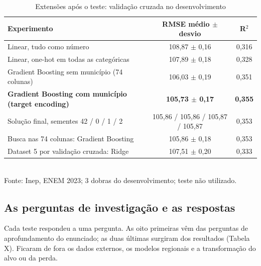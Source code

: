 \documentclass[conference,a4paper]{IEEEtran}
\begin{document}
\begin{table}[!t]
\caption{Extensões após o teste: validação cruzada no desenvolvimento}
\centering\footnotesize
\begin{tabularx}{\textwidth}{>{\raggedright\arraybackslash}Xcc}
\toprule
\textbf{Experimento} & \textbf{RMSE médio $\pm$ desvio} & \textbf{R$^2$} \\
\midrule
Linear, tudo como número & 108,87 $\pm$ 0,16 & 0,316 \\
Linear, one-hot em todas as categóricas & 107,89 $\pm$ 0,18 & 0,328 \\
Gradient Boosting sem município (74 colunas) & 106,03 $\pm$ 0,19 & 0,351 \\
\textbf{Gradient Boosting com município (target encoding)} & \textbf{105,73 $\pm$ 0,17} & \textbf{0,355} \\
Solução final, sementes 42 / 0 / 1 / 2 & 105,86 / 105,86 / 105,87 / 105,87 & 0,353 \\
Busca nas 74 colunas: Gradient Boosting & 105,86 $\pm$ 0,18 & 0,353 \\
Dataset 5 por validação cruzada: Ridge & 107,51 $\pm$ 0,20 & 0,333 \\
\bottomrule
\end{tabularx}
\\[2pt]{\scriptsize Fonte: Inep, ENEM 2023; 3 dobras do desenvolvimento; teste não utilizado.}
\end{table}


\subsection{As perguntas de investigação e as respostas}
Cada teste respondeu a uma pergunta. As oito primeiras vêm das perguntas de aprofundamento do enunciado; as duas últimas surgiram dos resultados (Tabela X). Ficaram de fora os dados externos, os modelos regionais e a transformação do alvo ou da perda.
\end{document}
